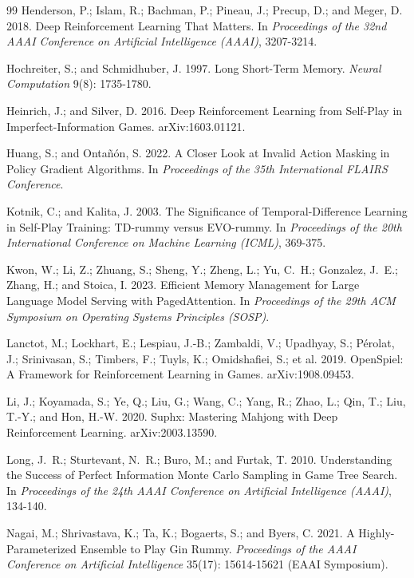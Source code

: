 \documentclass[letterpaper]{article} %
\begin{document}
\begin{thebibliography}{99}
Henderson, P.; Islam, R.; Bachman, P.; Pineau, J.; Precup, D.; and Meger, D.
2018.
Deep Reinforcement Learning That Matters.
In \emph{Proceedings of the 32nd AAAI Conference on Artificial Intelligence
(AAAI)}, 3207-3214.

Hochreiter, S.; and Schmidhuber, J. 1997.
Long Short-Term Memory.
\emph{Neural Computation} 9(8): 1735-1780.

Heinrich, J.; and Silver, D. 2016.
Deep Reinforcement Learning from Self-Play in Imperfect-Information Games.
arXiv:1603.01121.

Huang, S.; and Onta\~{n}\'{o}n, S. 2022.
A Closer Look at Invalid Action Masking in Policy Gradient Algorithms.
In \emph{Proceedings of the 35th International FLAIRS Conference}.

Kotnik, C.; and Kalita, J. 2003.
The Significance of Temporal-Difference Learning in Self-Play Training:
TD-rummy versus EVO-rummy.
In \emph{Proceedings of the 20th International Conference on Machine Learning
(ICML)}, 369-375.

Kwon, W.; Li, Z.; Zhuang, S.; Sheng, Y.; Zheng, L.; Yu, C.~H.; Gonzalez, J.~E.;
Zhang, H.; and Stoica, I. 2023.
Efficient Memory Management for Large Language Model Serving with PagedAttention.
In \emph{Proceedings of the 29th ACM Symposium on Operating Systems Principles
(SOSP)}.

Lanctot, M.; Lockhart, E.; Lespiau, J.-B.; Zambaldi, V.; Upadhyay, S.;
P\'{e}rolat, J.; Srinivasan, S.; Timbers, F.; Tuyls, K.; Omidshafiei, S.; et al.
2019.
OpenSpiel: A Framework for Reinforcement Learning in Games.
arXiv:1908.09453.

Li, J.; Koyamada, S.; Ye, Q.; Liu, G.; Wang, C.; Yang, R.; Zhao, L.; Qin, T.;
Liu, T.-Y.; and Hon, H.-W. 2020.
Suphx: Mastering Mahjong with Deep Reinforcement Learning.
arXiv:2003.13590.

Long, J.~R.; Sturtevant, N.~R.; Buro, M.; and Furtak, T. 2010.
Understanding the Success of Perfect Information Monte Carlo Sampling in Game Tree
Search.
In \emph{Proceedings of the 24th AAAI Conference on Artificial Intelligence
(AAAI)}, 134-140.

Nagai, M.; Shrivastava, K.; Ta, K.; Bogaerts, S.; and Byers, C. 2021.
A Highly-Parameterized Ensemble to Play Gin Rummy.
\emph{Proceedings of the AAAI Conference on Artificial Intelligence} 35(17):
15614-15621 (EAAI Symposium).


\end{thebibliography}
\end{document}
